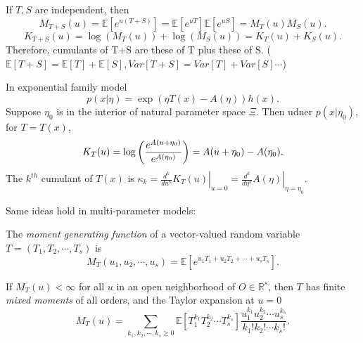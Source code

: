 \documentclass[a4paper]{article}
\begin{document}
\begin{remark}
	If $T, S$ are independent, then
	\begin{equation}
			M_{T+S}(u) = \mathbb{E}[e^{u(T+S)}] = \mathbb{E}[e^{uT}]\mathbb{E}[e^{uS}] = M_T(u)M_S(u).
	\end{equation}
	\begin{equation}
		K_{T+S}(u) = \log(M_T(u)) + \log(M_S(u)) = K_T(u) + K_S(u).
	\end{equation}
	Therefore, cumulants of T+S are these of T plus these of S. ($\mathbb{E}[T+S] = \mathbb{E}[T] + \mathbb{E}[S], Var[T+S] = Var[T] + Var[S] \cdots$)
\end{remark}

\begin{remark}
	In exponential family model
	\begin{equation*}
		p(x|\eta) = \exp(\eta T(x)-A(\eta))h(x).
	\end{equation*}
	Suppose $\eta_0$ is in the interior of natural parameter space $\Xi$. Then udner $p(x|\eta_0)$, for $T = T(x)$, 
	\begin{equation}
		K_T(u) = \log\left(\frac{e^{A(u + \eta_0)}}{e^{A(\eta_0)}}\right) = A(u + \eta_0) - A(\eta_0). \\
	\end{equation}
	The $k^{th}$ cumulant of $T(x)$ is $\kappa_k = \left.\frac{d^k}{du^k}K_T(u)\right|_{u = 0} =\left.\frac{d^k}{d\eta^k}A(\eta)\right|_{\eta = \eta_0} $.
\end{remark}

\noindent Same ideas hold in multi-parameter models:

\begin{defi}
	The \emph{moment generating function} of a vector-valued random variable $T = (T_1,T_2, \cdots, T_s)$ is 
	\begin{equation*}
		M_T(u_1, u_2, \cdots, u_s) = \mathbb{E}\left[e^{u_1 T_1 + u_2 T_2 + \cdots + u_s T_s}\right].
	\end{equation*} 
\end{defi}

\begin{prop}
	If $M_T(u) < \infty $ for all $u$ in an open neighborhood of $O \in \mathbb{R}^s$, then $T$ has finite \emph{mixed moments} of all orders, and the Taylor expansion at $u = 0$ 
	\begin{equation}
		M_T(u) = \sum\limits_{k_1, k_2, \cdots, k_s \geq 0} \mathbb{E}\left[T_1^{k_1} T_2^{k_2} \cdots T_s^{k_s}\right] \frac{u_1^{k_1} u_2^{k_2} \cdots u_s^{k_s}}{k_1! k_2! \cdots k_s!}.
	\end{equation}
\end{prop}
\end{document}
